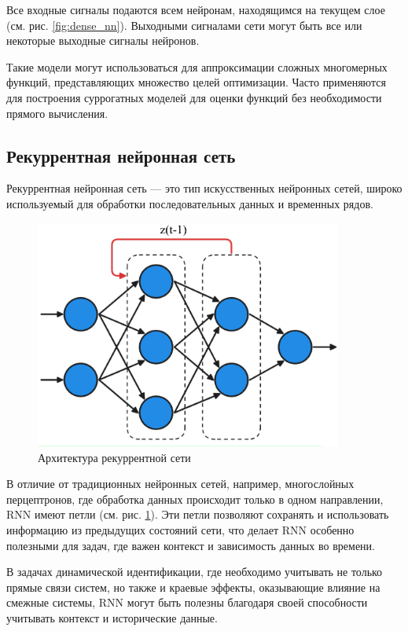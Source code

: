 Все входные сигналы подаются всем нейронам, находящимся 
на текущем слое (см. рис. \ref{fig:dense_nn}). Выходными сигналами сети могут быть все или некоторые
выходные сигналы нейронов.

Такие модели могут использоваться для аппроксимации сложных многомерных
функций, представляющих множество целей оптимизации. Часто применяются для
построения суррогатных моделей для оценки функций без необходимости прямого
вычисления.

\subsection{Рекуррентная нейронная сеть}

Рекуррентная нейронная сеть — это тип искусственных нейронных сетей, широко
используемый для обработки последовательных данных и временных рядов. 

\begin{figure}[htbp]
  \centering
    \includegraphics[width=0.9\textwidth]{figures/arch_rnn.png}
  \caption{Архитектура рекуррентной сети}\label{fig:rnn}
\end{figure}

В отличие от традиционных нейронных сетей, например, многослойных перцептронов, где
обработка данных происходит только в одном направлении, RNN имеют петли (см.
рис. \ref{fig:rnn}). Эти петли позволяют сохранять и использовать информацию из 
предыдущих состояний сети, что делает RNN особенно полезными для задач, где важен 
контекст и зависимость данных во времени. 

В задачах динамической идентификации, где необходимо учитывать не только прямые
связи систем, но также и краевые эффекты, оказывающие влияние на смежные
системы, RNN могут быть полезны благодаря своей способности учитывать контекст
и исторические данные.

